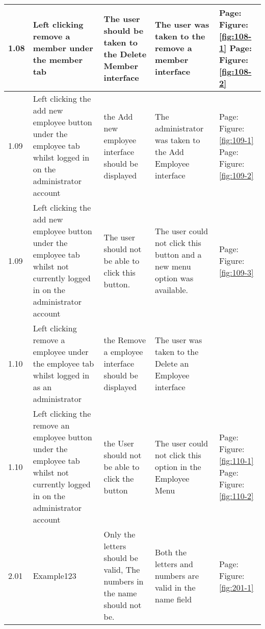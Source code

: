 \begin{flushleft}
\begin{longtable}{|p{1.0cm}|p{2.5cm}|p{3cm}|p{3.0cm}|p{2.5cm}|}
	1.08 & Left clicking remove a member under the member tab & The user should be taken to the Delete Member interface & The user was taken to the remove a member interface &  Page:\pageref{fig:108-1}  \newline Figure:\ref{fig:108-1} \newline  \newline Page:\pageref{fig:108-2}  \newline Figure:\ref{fig:108-2} \\ \hline
	1.09 & Left clicking the add new employee button under the employee tab whilst logged in on the administrator account &  the Add new employee interface should be displayed & The administrator was taken to the Add Employee interface &  Page:\pageref{fig:109-1}  \newline Figure:\ref{fig:109-1} \newline  \newline Page:\pageref{fig:109-2}  \newline Figure:\ref{fig:109-2}\\ \hline
	1.09 & Left clicking the add new employee button under the employee tab whilst not currently logged in on the administrator account & The user should not be able to click this button. & The user could not click this button and a new menu option was available. & Page:\pageref{fig:109-3}  \newline Figure:\ref{fig:109-3}\\ \hline
	1.10 & Left clicking remove a employee under the employee tab whilst logged in as an administrator & the Remove a employee interface should be displayed  & The user was taken to the Delete an Employee interface & \\ \hline
	1.10 & Left clicking the remove an employee button under the employee tab whilst not currently logged in on the administrator account & the User should not be able to click the button & The user could not click this option in the Employee Menu& Page:\pageref{fig:110-1}  \newline Figure:\ref{fig:110-1} \newline  \newline Page:\pageref{fig:110-2}  \newline Figure:\ref{fig:110-2}\\ \hline
	2.01 & Example123 & Only the letters should be valid, The numbers in the name should not be. & Both the letters and numbers are valid in the name field  & Page:\pageref{fig:201-1}  \newline Figure:\ref{fig:201-1}\\ \hline 

\end{longtable}
\end{flushleft}
